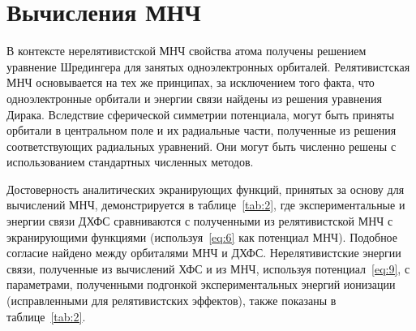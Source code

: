 \documentclass[10pt,pscyr]{hedlab}
\newcommand{\eq}  [1]{\eqref{eq:#1}}
\newcommand{\tab} [1]{\ref{tab:#1}}
\begin{document}
  \section{Вычисления МНЧ}
  \label{sec:4}
  
  В контексте нерелятивистской МНЧ свойства атома получены решением уравнение
  Шредингера для занятых одноэлектронных орбиталей. Релятивистская МНЧ
  основывается на тех же принципах, за исключением того факта, что
  одноэлектронные орбитали и энергии связи найдены из решения уравнения Дирака.
  Вследствие сферической симметрии потенциала, могут быть приняты орбитали в
  центральном поле и их радиальные части, полученные из решения соответствующих
  радиальных уравнений. Они могут быть численно решены с использованием
  стандартных численных методов.
  
  Достоверность аналитических экранирующих функций, принятых за основу для
  вычислений МНЧ, демонстрируется в таблице~\tab{2}, где экспериментальные и
  энергии связи ДХФС сравниваются с полученными из релятивистской МНЧ с
  экранирующими функциями (используя~\eq{6} как потенциал МНЧ). Подобное
  согласие найдено между орбиталями МНЧ и ДХФС. Нерелятивистские энергии связи,
  полученные из вычислений ХФС и из МНЧ, используя потенциал~\eq{9}, с
  параметрами, полученными подгонкой экспериментальных энергий ионизации
  (исправленными для релятивистских эффектов), также показаны в таблице~\tab{2}.
\end{document}
